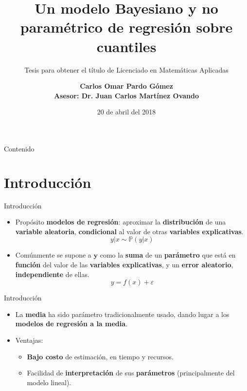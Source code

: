 \documentclass{beamer}
\title[Tesis Matem\'aticas Aplicadas]{Un modelo Bayesiano y no param\'etrico de regresi\'on sobre cuantiles}
\subtitle{Tesis para obtener el t\'itulo de Licenciado en Matem\'aticas Aplicadas}
\author[Omar Pardo]{\textbf {Carlos Omar Pardo G\'omez\\ \footnotesize Asesor: Dr. Juan Carlos Mart\'inez Ovando}} %
\institute[ITAM]{\textbf {Instituto Tecnol\'ogico Aut\'onomo de M\'exico}}
\date{20 de abril del 2018}
\begin{document}
\begin{frame}
  \titlepage
\end{frame}

\begin{frame}{Contenido}
  \tableofcontents
\end{frame}

\section{Introducci\'on}

\begin{frame}{Introducci\'on}{}
  \begin{itemize}
  \setlength\itemsep{2em}
  \item {
    Prop\'osito \textbf{modelos de regresi\'on}: aproximar la \textbf{distribuci\'on} de una \textbf{variable aleatoria}, \textbf{condicional} al valor de otras \textbf{variables explicativas}. \begin{equation*}
        y|x \sim \mathbb{P}(y|x)
    \end{equation*}
  }
  \item {
    Com\'unmente se supone a $\bm y$ como la \textbf{suma} de un \textbf{par\'ametro} que est\'a en \textbf{funci\'on} del valor de las \textbf{variables explicativas}, y un \textbf{error aleatorio}, \textbf{independiente} de ellas.
    \begin{equation*}
        y = f(x) + \varepsilon
    \end{equation*}{}
  }
  \end{itemize}
\end{frame}

\begin{frame}{Introducci\'on}{}
  \begin{itemize}
  \setlength\itemsep{2em}
  \item {
    La \textbf{media} ha sido par\'ametro tradicionalmente usado, dando lugar a los \textbf{modelos de regresi\'on a la media}.
  }
  \item {
    Ventajas: 
    \begin{itemize}
        \setlength\itemsep{1em}
        \item {\textbf{Bajo costo} de estimaci\'on, en tiempo y recursos.}
        \item {Facilidad de \textbf{interpretaci\'on} de sus \textbf{par\'ametros} (principalmente del modelo lineal).}
    \end{itemize}
  }
  \end{itemize}
\end{frame}
\end{document}
